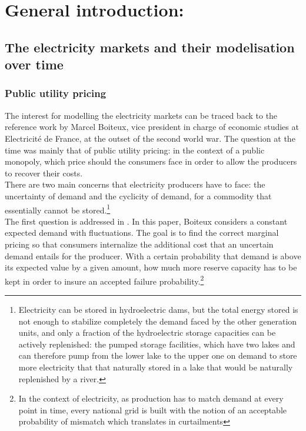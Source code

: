 \renewcommand{\thesection}{\arabic{chapter}.\arabic{section}}

\chapter*{General introduction: }
\label{chap:intro}
\cleardoublepage
\doublespacing

\section*{The electricity markets and their modelisation over time}
\subsection*{Public utility pricing}

The interest for modelling the electricity markets can be traced back to the reference work by Marcel Boiteux, vice president in charge of economic studies at Electricité de France, at the outset of the second world war. The question at the time was mainly that of public utility pricing: in the context of a public monopoly, which price should the consumers face in order to allow the producers to recover their costs. \\

There are two main concerns that electricity producers have to face: the uncertainty of demand and the cyclicity of demand, for a commodity that essentially cannot be stored.\footnote{Electricity can be stored in hydroelectric dams, but the total energy stored is not enough to stabilize completely the demand faced by the other generation units, and only a fraction of the hydroelectric storage capacities can be actively replenished: the pumped storage facilities, which have two lakes and can therefore pump from the lower lake to the upper one on demand to store more electricity that that naturally stored in a lake that would be naturally replenished by a river.} \\

The first question is addressed in \cite{boiteux1951tarification}. In this paper, Boiteux considers a constant expected demand with fluctuations. The goal is to find the correct marginal pricing so that consumers internalize the additional cost that an uncertain demand entails for the producer. With a certain probability that demand is above its expected value by a given amount, how much more reserve capacity has to be kept in order to insure an accepted failure probability.\footnote{In the context of electricity, as production has to match demand at every point in time, every national grid is built with the notion of an acceptable probability of mismatch which translates in curtailments}\\

